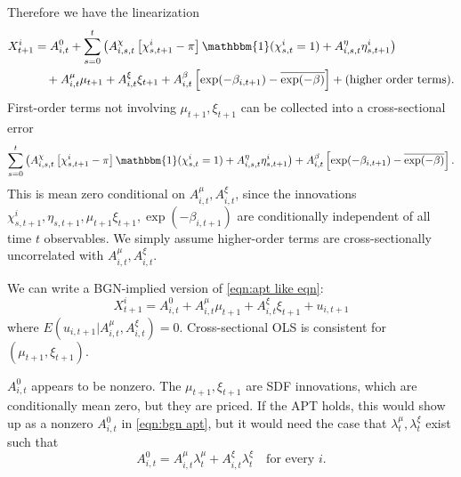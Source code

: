 Therefore we have the linearization
\begin{align}
    X_{t+1}^i 
    &= A_{i,t}^0 + \sum_{s=0}^t \left(A_{i,s,t}^\chi \left[\chi_{s,t+1}^i-\pi\right]{\mathbbm{1}}(\chi_{s,t}^i=1) + A^\eta_{i,s,t} \eta_{s,t+1}^i\right) \nonumber\\
    &\quad + A_{i,t}^\mu \mu_{t+1} + A_{i,t}^\xi \xi_{t+1} + A_{i,t}^\beta \left[\exp(-\beta_{i,t+1})-\overline{\exp(-\beta)}\right] + \text{(higher order terms)}. \nonumber
\end{align}
First-order terms not involving $\mu_{t+1}, \xi_{t+1}$ can be collected into a cross-sectional error $$\sum_{s=0}^t \left(A_{i,s,t}^\chi \left[\chi_{s,t+1}^i-\pi\right]{\mathbbm{1}}(\chi_{s,t}^i=1) + A^\eta_{i,s,t} \eta_{s,t+1}^i\right) + A_{i,t}^\beta \left[\exp(-\beta_{i,t+1})-\overline{\exp(-\beta)}\right].$$ This is mean zero conditional on $A_{i,t}^\mu,A_{i,t}^\xi$, since the innovations $\chi_{s, t+1}^i, \eta_{s, t+1}, \mu_{t+1} \xi_{t+1}, \exp(-\beta_{i, t+1})$ are conditionally independent of all time $t$ observables. We simply assume higher-order terms are cross-sectionally uncorrelated with $A_{i,t}^\mu,A_{i,t}^\xi$.

We can write a BGN-implied version of \eqref{eqn:apt like eqn}:
\begin{equation}
    X_{t+1}^i = A_{i,t}^0 + A_{i,t}^\mu \mu_{t+1} + A_{i,t}^\xi \xi_{t+1} + u_{i,t+1} \label{eqn:bgn apt}
\end{equation} 
where $E(u_{i,t+1}|A_{i,t}^\mu,A_{i,t}^\xi)=0$. Cross-sectional OLS is consistent for $(\mu_{t+1},\xi_{t+1})$.


$A_{i,t}^0$ appears to be nonzero.  The $\mu_{t+1},\xi_{t+1}$ are SDF innovations, which are conditionally mean zero, but they are priced. If the APT holds, this would show up as a nonzero $A_{i,t}^0$ in \eqref{eqn:bgn apt}, but it would need the case that $\lambda_t^\mu,\lambda_t^\xi$ exist such that 
$$A_{i,t}^0 = A_{i,t}^\mu\lambda_t^\mu + A_{i,t}^\xi\lambda_t^\xi \quad\text{for every } i.$$   

